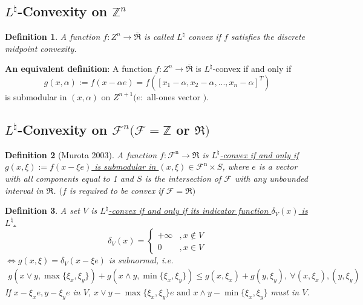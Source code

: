 \documentclass[11pt,a4paper]{article}
\newtheorem{definition}{Definition}
\begin{document}
\subsection{$L^\natural$-Convexity on $\mathbb{Z}^n$}
\begin{definition}
    A function $f: Z^{n} \rightarrow \bar{\Re}$ is called $L^{\natural}$ convex if $f$ satisfies the discrete midpoint convexity.
\end{definition}
\textbf{An equivalent definition}: A function $f: Z^{n} \rightarrow \bar{\Re}$ is $L^\natural$-convex if and only if
$$
g(x, \alpha):=f(x-\alpha e)=f([x_1-\alpha,x_2-\alpha,...,x_n-\alpha]^T)
$$
is submodular in $(x, \alpha)$ on $Z^{n+1}(e:$ all-ones vector $)$.





\subsection{$L^\natural$-Convexity on $\mathcal{F}^{n}(\mathcal{F}=\mathbb{Z}$ or $\Re)$}
\begin{definition}[Murota 2003]
    \quad

    A function $f: \mathcal{F}^{\mathrm{n}} \rightarrow \Re$ is \underline{$L^{\natural}$-convex if and only if $g(x, \xi):=f(x-\xi e)$ is submodular in $(x, \xi) \in \mathcal{F}^{\mathrm{n}} \times S$}, where $e$ is a vector with all components equal to 1 and $S$ is the intersection of $\mathcal{F}$ with any unbounded interval in $\mathfrak{R}$. $(f$ is required to be convex if $\mathcal{F}=\mathfrak{R})$
\end{definition}

\begin{definition}
    A set $V$ is \underline{$L^{\natural}$-convex if and only if its indicator function $\delta_V(x)$ is $L^{\natural}$.} $$\delta_V(x)=\left\{\begin{matrix}
        +\infty &,x\notin V\\
        0&, x\in V
    \end{matrix}\right.$$
    $\Leftrightarrow g(x,\xi)=\delta_V(x-\xi e)$ is subnormal, i.e.
    \begin{equation}
        \begin{aligned}
            g(x\vee y,\max\{\xi_x,\xi_y\})+g(x\wedge y,\min\{\xi_x,\xi_y\})\leq g(x,\xi_x)+g(y,\xi_y),\ \forall (x,\xi_x),(y,\xi_y)
        \end{aligned}
        \nonumber
    \end{equation}
    If $x-\xi_xe,y-\xi_y e$ in $V$, $x\vee y-\max\{\xi_x,\xi_y\}e\text{ and } x\wedge y-\min\{\xi_x,\xi_y\}$ must in $V$.
\end{definition}
\end{document}

